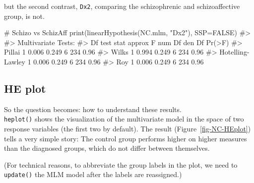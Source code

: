 \documentclass[
  letterpaper,
  10pt,
  krantz2]{krantz}
\makeatletter
\newenvironment{Shaded}{\begin{snugshade}}{\end{snugshade}}
\newcommand{\AttributeTok}[1]{\textcolor[rgb]{0.40,0.45,0.13}{#1}}
\newcommand{\CommentTok}[1]{\textcolor[rgb]{0.37,0.37,0.37}{#1}}
\newcommand{\ConstantTok}[1]{\textcolor[rgb]{0.56,0.35,0.01}{#1}}
\newcommand{\FunctionTok}[1]{\textcolor[rgb]{0.28,0.35,0.67}{#1}}
\newcommand{\NormalTok}[1]{\textcolor[rgb]{0.00,0.23,0.31}{#1}}
\newcommand{\OtherTok}[1]{\textcolor[rgb]{0.00,0.23,0.31}{#1}}
\newcommand{\SpecialCharTok}[1]{\textcolor[rgb]{0.37,0.37,0.37}{#1}}
\newcommand{\StringTok}[1]{\textcolor[rgb]{0.13,0.47,0.30}{#1}}
\newenvironment{kframe}{%
  \medskip{}
  \setlength{\fboxsep}{.8em}
  \def\at@end@of@kframe{}%
  \ifinner\ifhmode%
  \def\at@end@of@kframe{\end{minipage}}%
  \begin{minipage}{\columnwidth}%
  \fi\fi%
  \def\FrameCommand##1{\hskip\@totalleftmargin \hskip-\fboxsep
  \colorbox{shadecolor}{##1}\hskip-\fboxsep
      \hskip-\linewidth \hskip-\@totalleftmargin \hskip\columnwidth}%
  \MakeFramed {\advance\hsize-\width
    \@totalleftmargin\z@ \linewidth\hsize
    \@setminipage}}%
{\par\unskip\endMakeFramed%
  \at@end@of@kframe}
\renewenvironment{Shaded}{\begin{kframe}}{\end{kframe}}
\makeatother
\begin{document}
but the second contrast, \texttt{Dx2}, comparing the schizophrenic and
schizoaffective group, is not.

\begin{Shaded}
\begin{Highlighting}[]
\CommentTok{\# Schizo vs SchizAff}
\FunctionTok{print}\NormalTok{(}\FunctionTok{linearHypothesis}\NormalTok{(NC.mlm, }\StringTok{"Dx2"}\NormalTok{), }\AttributeTok{SSP=}\ConstantTok{FALSE}\NormalTok{)}
\CommentTok{\#\textgreater{} }
\CommentTok{\#\textgreater{} Multivariate Tests: }
\CommentTok{\#\textgreater{}                  Df test stat approx F num Df den Df Pr(\textgreater{}F)}
\CommentTok{\#\textgreater{} Pillai            1     0.006    0.249      6    234   0.96}
\CommentTok{\#\textgreater{} Wilks             1     0.994    0.249      6    234   0.96}
\CommentTok{\#\textgreater{} Hotelling{-}Lawley  1     0.006    0.249      6    234   0.96}
\CommentTok{\#\textgreater{} Roy               1     0.006    0.249      6    234   0.96}
\end{Highlighting}
\end{Shaded}

\subsection{HE plot}\label{he-plot}

So the question becomes: how to understand these results.\\
\texttt{heplot()} shows the visualization of the multivariate model in
the space of two response variables (the first two by default). The
result (Figure~\ref{fig-NC-HEplot}) tells a very simple story: The
control group performs higher on higher measures than the diagnosed
groups, which do not differ between themselves.

(For technical reasons, to abbreviate the group labels in the plot, we
need to \texttt{update()} the MLM model after the labels are
reassigned.)

\begin{Shaded}
\end{Shaded}
\end{document}
